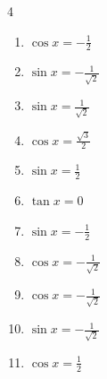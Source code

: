 \begin{multicols}{4}
\begin{enumerate}
  \item $\displaystyle \cos{x}  = -\frac{1}{2}$


  \item $\displaystyle \sin{x}  = -\frac{1}{\sqrt{2}}$


  \item $\displaystyle \sin{x}  = \frac{1}{\sqrt{2}}$


  \item $\displaystyle \cos{x}  = \frac{\sqrt{3}}{2}$


  \item $\displaystyle \sin{x}  = \frac{1}{2}$


  \item $\displaystyle \tan{x}  = 0$

        \phantom{$\displaystyle x = 0 , \pi$}

  \item $\displaystyle \sin{x}  = -\frac{1}{2}$


\columnbreak %

  \item $\displaystyle \cos{x}  = -\frac{1}{\sqrt{2}}$


  \item $\displaystyle \cos{x}  = -\frac{1}{\sqrt{2}}$


  \item $\displaystyle \sin{x}  = -\frac{1}{\sqrt{2}}$


  \item $\displaystyle \cos{x}  = \frac{1}{2}$



\end{enumerate}
\end{multicols}
